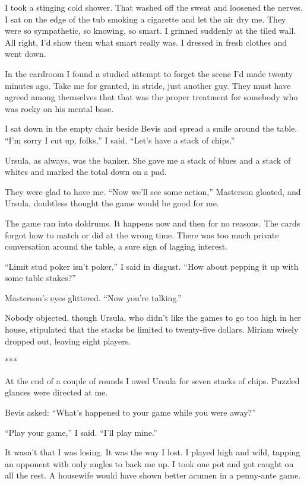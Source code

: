 \documentclass{novel}
\begin{document}
{I took a stinging cold shower. That washed off the sweat and loosened the nerves. I sat on the edge of the tub smoking a cigarette and let the air dry me. They were so sympathetic, so knowing, so smart. I grinned suddenly at the tiled wall. All right, I’d show them what smart really was. I dressed in fresh clothes and went down.

In the cardroom I found a studied attempt to forget the scene I’d made twenty minutes ago. Take me for granted, in stride, just another guy. They must have agreed among themselves that that was the proper treatment for somebody who was rocky on his mental base.

I sat down in the empty chair beside Bevis and spread a smile around the table. “I’m sorry I cut up, folks,” I said. “Let’s have a stack of chips.”

Ursula, as always, was the banker. She gave me a stack of blues and a stack of whites and marked the total down on a pad.

They were glad to have me. “Now we’ll see some action,” Masterson gloated, and Ursula, doubtless thought the game would be good for me.

The game ran into doldrums. It happens now and then for no reasons. The cards forgot how to match or did at the wrong time. There was too much private conversation around the table, a sure sign of lagging interest.

“Limit stud poker isn’t poker,” I said in disgust. “How about pepping it up with some table stakes?”

Masterson’s eyes glittered. “Now you’re talking.”

Nobody objected, though Ursula, who didn’t like the games to go too high in her house, stipulated that the stacks be limited to twenty-five dollars. Miriam wisely dropped out, leaving eight players.

***

At the end of a couple of rounds I owed Ursula for seven stacks of chips. Puzzled glances were directed at me.

Bevis asked: “What’s happened to your game while you were away?”

“Play your game,” I said. “I’ll play mine.”

It wasn’t that I was losing. It was the way I lost. I played high and wild, tapping an opponent with only angles to back me up. I took one pot and got caught on all the rest. A housewife would have shown better acumen in a penny-ante game.

}
\end{document}
